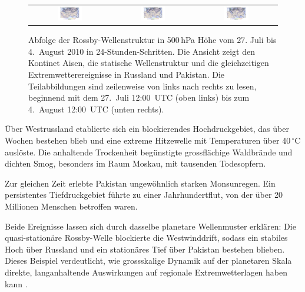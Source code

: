 \begin{figure}
\begin{tabular}{ccc}
		\includegraphics[width=0.32\textwidth, trim=3cm 3cm 3cm 1.1cm, clip]{papers/rossby/images/data_2010_8_2_12_00_500.jpg} &
		\includegraphics[width=0.32\textwidth, trim=3cm 3cm 3cm 1.1cm, clip]{papers/rossby/images/data_2010_8_3_12_00_500.jpg} &
		\includegraphics[width=0.32\textwidth, trim=3cm 3cm 3cm 1.1cm, clip]{papers/rossby/images/data_2010_8_4_12_00_500.jpg}   \\
	\end{tabular}
	\caption{Abfolge der Rossby-Wellenstruktur in 500\,hPa Höhe vom 27. Juli bis 4.\ August 2010 in 24-Stunden-Schritten.
	Die Ansicht zeigt den Kontinet Aisen, die statische Wellenstruktur und die
	gleichzeitigen Extremwetterereignisse in Russland und Pakistan.
		Die Teilabbildungen sind zeilenweise von links nach rechts zu lesen, beginnend mit dem 27.\ Juli 12:00~UTC (oben links)
		bis zum 4.\ August 12:00~UTC (unten rechts).}
	\label{fig:rossby_grid_2010}
\end{figure}


Über Westrussland etablierte sich ein blockierendes Hochdruckgebiet, das über Wochen bestehen blieb und eine extreme Hitzewelle mit Temperaturen über 40\,$^\circ$C auslöste.
Die anhaltende Trockenheit begünstigte grossflächige Waldbrände und dichten Smog, besonders im Raum Moskau, mit tausenden Todesopfern.

Zur gleichen Zeit erlebte Pakistan ungewöhnlich starken Monsunregen. Ein
persistentes Tiefdruckgebiet führte zu einer Jahrhundertflut, von der über 20
Millionen Menschen betroffen waren.

Beide Ereignisse lassen sich durch dasselbe planetare Wellenmuster erklären:
Die quasi-stationäre Rossby-Welle blockierte die Westwinddrift, sodass ein
stabiles Hoch über Russland und ein stationäres Tief über Pakistan bestehen
blieben. Dieses Beispiel verdeutlicht, wie grossskalige Dynamik auf der
planetaren Skala direkte, langanhaltende Auswirkungen auf regionale
Extremwetterlagen haben kann \cite{rossby:petoukhov2013}.

